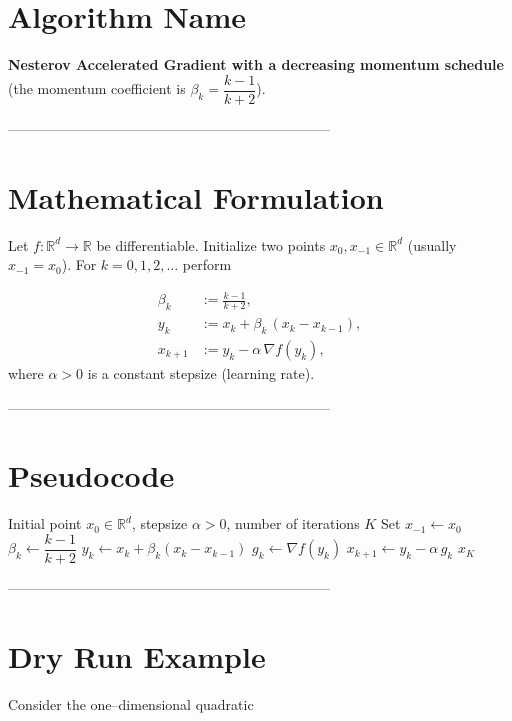 \documentclass[11pt]{article}
\newcommand{\grad}{\nabla}
\newcommand{\R}{\mathbb{R}}
\begin{document}
\section*{Algorithm Name}
\textbf{Nesterov Accelerated Gradient with a decreasing momentum schedule}  
(the momentum coefficient is \(\beta_k=\dfrac{k-1}{k+2}\)).  

---------------------------------------------------------------------

\section*{Mathematical Formulation}
Let \(f:\R^d\rightarrow\R\) be differentiable.  
Initialize two points \(x_0,x_{-1}\in\R^d\) (usually \(x_{-1}=x_0\)).  
For \(k=0,1,2,\dots\) perform  

\[
\boxed{
\begin{aligned}
\beta_k &:= \frac{k-1}{k+2},\\[2mm]
y_k     &:= x_k + \beta_k\,(x_k-x_{k-1}),\\[2mm]
x_{k+1} &:= y_k - \alpha \,\grad f(y_k),
\end{aligned}}
\tag{1}
\]
where \(\alpha>0\) is a constant stepsize (learning rate).  

---------------------------------------------------------------------

\section*{Pseudocode}
\begin{algorithm}[H]
\caption{Nesterov Accelerated Gradient (NAG) with \(\beta_k=\frac{k-1}{k+2}\)}
\begin{algorithmic}[1]
\Require Initial point \(x_0\in\R^d\), stepsize \(\alpha>0\), number of iterations \(K\)
\State Set \(x_{-1}\gets x_0\)
    \State \(\beta_k \gets \dfrac{k-1}{k+2}\)          
    \State \(y_k \gets x_k + \beta_k (x_k-x_{k-1})\) 
    \State \(g_k \gets \grad f(y_k)\)                
    \State \(x_{k+1} \gets y_k - \alpha\, g_k\)      
\EndFor
\State \Return \(x_K\)
\end{algorithmic}
\end{algorithm}

---------------------------------------------------------------------

\section*{Dry Run Example}
Consider the one–dimensional quadratic  
\end{document}
